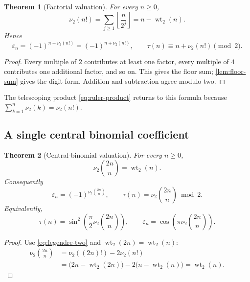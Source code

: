 \documentclass[11pt,oneside]{article}
\numberwithin{equation}{section}
\newtheorem{theorem}{Theorem}[section]
\theoremstyle{definition}
\theoremstyle{remark}
\newcommand{\wt}{\operatorname{wt}_2}
\newcommand{\vtwo}{\nu_2}
\newcommand{\eps}{\varepsilon}
\begin{document}
\begin{theorem}[Factorial valuation]
\label{thm:factorial-valuation}
For every \(n\ge0\),
\begin{equation}
  \vtwo(n!)=\sum_{j\ge1}\left\lfloor\frac n{2^j}\right\rfloor
           =n-\wt(n).
  \label{eq:legendre-two}
\end{equation}
Hence
\begin{equation}
  \boxed{
  \eps_n=(-1)^{n-\vtwo(n!)}=(-1)^{n+\vtwo(n!)},
  \qquad
  \tau(n)\equiv n+\vtwo(n!)\pmod2.}
  \label{eq:factorial-thue-morse}
\end{equation}
\end{theorem}

\begin{proof}
Every multiple of \(2\) contributes at least one factor, every multiple of
\(4\) contributes one additional factor, and so on.  This gives the floor
sum; \cref{lem:floor-sum} gives the digit form.  Addition and subtraction agree
modulo two.
\end{proof}

The telescoping product \eqref{eq:ruler-product} returns to this formula because
\(\sum_{k=1}^{n}\vtwo(k)=\vtwo(n!)\).

\subsection{A single central binomial coefficient}

\begin{theorem}[Central-binomial valuation]
\label{thm:central-binomial}
For every \(n\ge0\),
\begin{equation}
  \boxed{
  \vtwo\binom{2n}{n}=\wt(n).}
  \label{eq:central-v2}
\end{equation}
Consequently
\begin{equation}
  \boxed{
  \eps_n=(-1)^{\vtwo\binom{2n}{n}},
  \qquad
  \tau(n)=\vtwo\binom{2n}{n}\bmod2.}
  \label{eq:central-thue-morse}
\end{equation}
Equivalently,
\begin{equation}
  \tau(n)=\sin^2\!\left(\frac\pi2\vtwo\binom{2n}{n}\right),
  \qquad
  \eps_n=\cos\!\left(\pi\vtwo\binom{2n}{n}\right).
  \label{eq:central-trig}
\end{equation}
\end{theorem}

\begin{proof}
Use \eqref{eq:legendre-two} and \(\wt(2n)=\wt(n)\):
\begin{align*}
 \vtwo\binom{2n}{n}
 &=\vtwo((2n)!)-2\vtwo(n!)\\
 &=\bigl(2n-\wt(2n)\bigr)-2\bigl(n-\wt(n)\bigr)
  =\wt(n).
\end{align*}
\end{proof}
\end{document}
